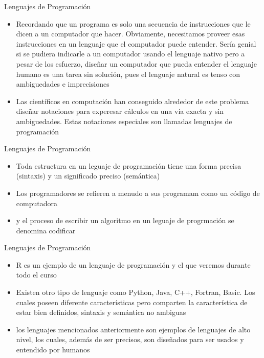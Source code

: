\documentclass[ignorenonframetext,]{beamer}
\begin{document}
\begin{frame}{Lenguajes de Programación}

\begin{itemize}
\item
  Recordando que un programa es solo una secuencia de instrucciones que
  le dicen a un computador que hacer. Obviamente, necesitamos proveer
  esas instrucciones en un lenguaje que el computador puede entender.
  Sería genial si se pudiera indicarle a un computador usando el
  lenguaje nativo pero a pesar de los esfuerzo, diseñar un computador
  que pueda entender el lenguaje humano es una tarea sin solución, pues
  el lenguaje natural es tenso con ambiguedades e imprecisiones
\item
  Las científicos en computación han conseguido alrededor de este
  problema diseñar notaciones para experesar cálculos en una vía exacta
  y sin ambiguedades. Estas notaciones especiales son llamadas lenguajes
  de programación
\end{itemize}

\end{frame}

\begin{frame}{Lenguajes de Programación}

\begin{itemize}
\item
  Toda estructura en un leguaje de programación tiene una forma precisa
  (sintaxis) y un significado preciso (semántica)
\item
  Los programadores se refieren a menudo a sus programam como un código
  de computadora
\item
  y el proceso de escribir un algoritmo en un leguaje de progrmación se
  denomina codificar
\end{itemize}

\end{frame}

\begin{frame}{Lenguajes de Programación}

\begin{itemize}
\item
  R es un ejemplo de un lenguaje de programación y el que veremos
  durante todo el curso
\item
  Existen otro tipo de lenguaje como Python, Java, C++, Fortran, Basic.
  Los cuales poseen diferente características pero comparten la
  característica de estar bien definidos, sintaxis y semántica no
  ambiguas
\item
  los lenguajes mencionados anteriormente son ejemplos de lenguajes de
  alto nivel, los cuales, además de ser precisos, son diseñados para ser
  usados y entendido por humanos
\end{itemize}

\end{frame}
\end{document}
